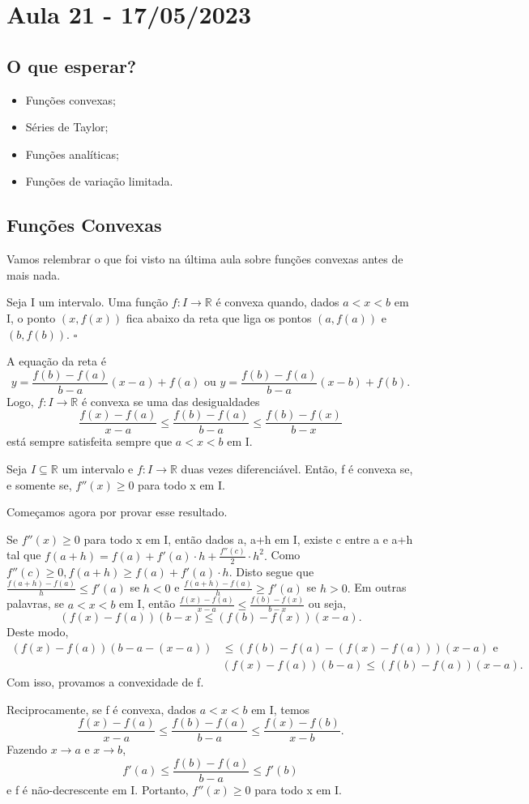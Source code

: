 \documentclass[Analysis/analysis_notes.tex]{subfiles}
\begin{document}
\section{Aula 21 - 17/05/2023}
\subsection{O que esperar?}
\begin{itemize}
	\item Fun\c cões convexas;
	\item Séries de Taylor;
	\item Fun\c cões analíticas;
	\item Fun\c cões de varia\c cão limitada.
\end{itemize}
\subsection{Fun\c cões Convexas}
Vamos relembrar o que foi visto na última aula sobre fun\c cões convexas antes de mais nada.
\begin{def*}
	Seja I um intervalo. Uma fun\c cão \(f:I\rightarrow \mathbb{R}\) é convexa quando,
	dados \(a < x < b\) em I, o ponto \((x, f(x))\) fica abaixo da reta que
	liga os pontos \((a, f(a))\) e \((b, f(b))\). \(\square\)
\end{def*}
A equa\c cão da reta é
\[
	y = \frac{f(b)-f(a)}{b-a}(x-a)+f(a) \text{ ou } y = \frac{f(b)-f(a)}{b-a}(x-b)+f(b).
\]
Logo, \(f:I\rightarrow \mathbb{R}\) é convexa se uma das desigualdades
\[
	\frac{f(x) - f(a)}{x-a}\leq \frac{f(b) - f(a)}{b-a}\leq \frac{f(b)-f(x)}{b-x}
\]
está sempre satisfeita sempre que \(a < x < b\) em I.
\begin{theorem*}
	Seja \(I\subseteq{\mathbb{R}}\) um intervalo e \(f:I\rightarrow \mathbb{R}\) duas vezes diferenciável.
	Então, f é convexa se, e somente se, \(f''(x)\geq 0\) para todo x em I.
\end{theorem*}
Come\c camos agora por provar esse resultado.
\begin{proof*}
	Se \(f''(x)\geq 0\) para todo x em I, então dados a, a+h em I, existe
	c entre a e a+h tal que \(f(a+h) = f(a) + f'(a)\cdot h + \frac{f''(c)}{2}\cdot h^{2}.\)
	Como \(f''(c)\geq 0, f(a+h)\geq f(a) + f'(a)\cdot h.\) Disto segue que
	\(\frac{f(a+h)-f(a)}{h}\leq f'(a)\) se \(h < 0\) e \(\frac{f(a+h)-f(a)}{h}\geq f'(a)\)
	se \(h > 0.\) Em outras palavras, se \(a < x < b\) em I, então \(\frac{f(x)-f(a)}{x-a}\leq \frac{f(b)-f(x)}{b-x}\)
	ou seja,
	\[
		(f(x)-f(a))(b-x)\leq (f(b)-f(x))(x-a).
	\]
	Deste modo,
	\begin{align*}
		(f(x)-f(a))(b-a-(x-a)) & \leq (f(b)-f(a)-(f(x)-f(a)))(x-a)\text{ e } \\
		                       & (f(x)-f(a))(b-a)\leq (f(b)-f(a))(x-a).
	\end{align*}
	Com isso, provamos a convexidade de f.

	Reciprocamente, se f é convexa, dados \(a < x < b\) em I, temos
	\[
		\frac{f(x)-f(a)}{x-a}\leq \frac{f(b)-f(a)}{b-a}\leq \frac{f(x) - f(b)}{x-b}.
	\]
	Fazendo \(x\rightarrow a\) e \(x\rightarrow b\),
	\[
		f'(a)\leq \frac{f(b)-f(a)}{b-a}\leq f'(b)
	\]
	e f é não-decrescente em I. Portanto, \(f''(x)\geq 0\) para todo x em I. \qedsymbol
\end{proof*}
\end{document}
